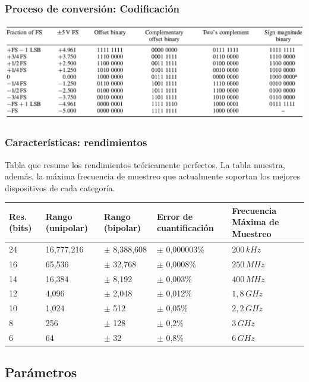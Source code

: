 \documentclass{beamer}
\begin{document}
\begin{frame}
\frametitle{Proceso de conversión: Codificación}
\begin{center}
\includegraphics[width=\textwidth]{d3/tabla_codigos_binarios}
\end{center}
\end{frame}

\begin{frame}
\frametitle{Características: rendimientos}
Tabla que resume los rendimientos teóricamente perfectos. 
La tabla muestra, además, la máxima frecuencia de muestreo que actualmente
soportan los mejores dispositivos de cada categoría.
\begin{table}
\begin{tabular}{|p{0.8cm}|p{1.8cm}|p{2cm}|p{2.4cm}|p{2cm}|} \hline
\bf{Res. (bits)} & \bf{Rango (unipolar)} & \bf{Rango (bipolar)} &
\bf{Error de cuantificación} & \bf{Frecuencia Máxima de Muestreo} \\ \hline
    24 & 16,777,216 & $\pm$ 8,388,608 & $\pm$ 0,000003\% & $200\,kHz$  \\
    16 & 65,536     & $\pm$ 32,768    & $\pm$ 0,0008\%   & $250\,MHz$  \\
    14 & 16,384     & $\pm$ 8,192     & $\pm$ 0,003\%    & $400\,MHz$  \\
    12 & 4,096      & $\pm$ 2,048     & $\pm$ 0,012\%    & $1,8\,GHz$  \\
    10 & 1,024      & $\pm$ 512       & $\pm$ 0,05\%     & $2,2\,GHz$  \\
    8  & 256        & $\pm$ 128       & $\pm$ 0,2\%      & $3\,GHz$    \\
    6  & 64         & $\pm$ 32        & $\pm$ 0,8\%      & $6\,GHz$    \\ \hline
\end{tabular}
\end{table}
\end{frame}

\subsection{Parámetros}
\end{document}
